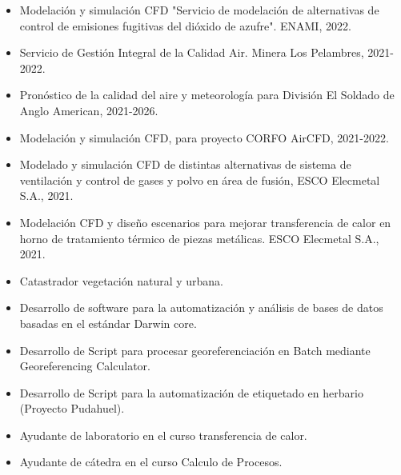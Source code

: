 \documentclass[10pt,letter,ragged2e]{altacv}
\begin{document}
\begin{itemize}
	\item Modelación y simulación CFD "Servicio de modelación de alternativas de control de emisiones fugitivas del dióxido de azufre". ENAMI, 2022.
	\item Servicio de Gestión Integral de la Calidad Air. Minera Los Pelambres, 2021-2022.
  \item Pronóstico de la calidad del aire y meteorología para División El Soldado de Anglo American, 2021-2026.
  \item Modelación y simulación CFD, para proyecto CORFO AirCFD, 2021-2022.
  \item  Modelado y simulación CFD de distintas alternativas de sistema de ventilación y control de gases y polvo en área de fusión, ESCO Elecmetal S.A., 2021.
  \item Modelación CFD y diseño escenarios para mejorar transferencia de calor en horno de tratamiento térmico de piezas metálicas. ESCO Elecmetal S.A., 2021.
\end{itemize}

\divider

\begin{itemize}
\item Catastrador vegetación natural y urbana.
\item{Desarrollo de software para la automatización y análisis de bases de datos basadas en el estándar Darwin core.}
\item{Desarrollo de Script para procesar georeferenciación en Batch mediante Georeferencing Calculator.}
\item Desarrollo de Script para la automatización de etiquetado en herbario (Proyecto Pudahuel).
\end{itemize}

\divider

\begin{itemize}
\item{Ayudante de laboratorio en el curso transferencia de calor.}
\item{Ayudante de cátedra en el curso Calculo de Procesos. }
\end{itemize}
\end{document}
